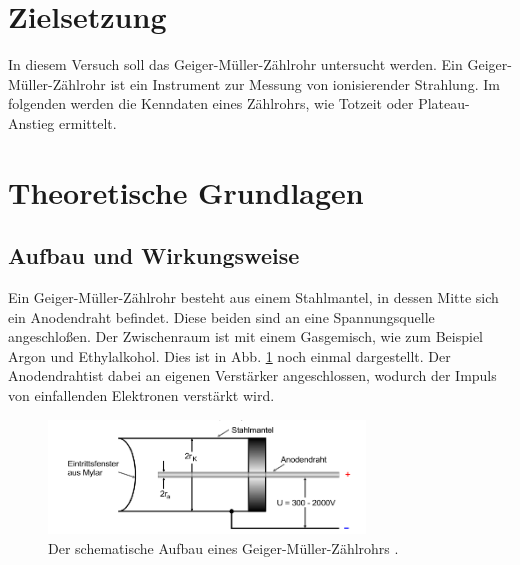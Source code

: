 \section{Zielsetzung}
In diesem Versuch soll das Geiger-Müller-Zählrohr untersucht werden.
Ein Geiger-Müller-Zählrohr ist ein Instrument zur Messung von ionisierender Strahlung.
Im folgenden werden die Kenndaten eines Zählrohrs, wie Totzeit oder Plateau-Anstieg ermittelt.



\section{Theoretische Grundlagen}
\subsection{Aufbau und Wirkungsweise}

\noindent
Ein Geiger-Müller-Zählrohr besteht aus einem Stahlmantel, in dessen Mitte sich ein Anodendraht befindet. Diese beiden sind an eine Spannungsquelle angeschloßen.
Der Zwischenraum ist mit einem Gasgemisch, wie zum Beispiel Argon und Ethylalkohol. Dies ist in Abb. \ref{img:aufbau} noch einmal dargestellt. Der Anodendrahtist dabei an eigenen
Verstärker angeschlossen, wodurch der Impuls von einfallenden Elektronen verstärkt wird.

\begin{figure}[H]
    \centering
    \includegraphics[width=0.75\textwidth]{images/Aufbau.PNG}
    \caption{Der schematische Aufbau eines Geiger-Müller-Zählrohrs \protect \cite{V703}.}
    \label{img:aufbau}
\end{figure}

